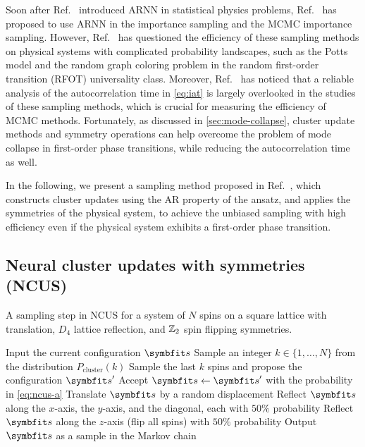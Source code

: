 Soon after Ref.~\cite{wu2019solving} introduced ARNN in statistical physics problems, Ref.~\cite{nicoli2020asymptotically} has proposed to use ARNN in the importance sampling and the MCMC importance sampling. However, Ref.~\cite{ciarella2023machine} has questioned the efficiency of these sampling methods on physical systems with complicated probability landscapes, such as the Potts model and the random graph coloring problem in the random first-order transition (RFOT) universality class. Moreover, Ref.~\cite{bialas2023analysis} has noticed that a reliable analysis of the autocorrelation time in \cref{eq:iat} is largely overlooked in the studies of these sampling methods, which is crucial for measuring the efficiency of MCMC methods. Fortunately, as discussed in \cref{sec:mode-collapse}, cluster update methods and symmetry operations can help overcome the problem of mode collapse in first-order phase transitions, while reducing the autocorrelation time as well.

In the following, we present a sampling method proposed in Ref.~\cite{wu2021unbiased}, which constructs cluster updates using the AR property of the ansatz, and applies the symmetries of the physical system, to achieve the unbiased sampling with high efficiency even if the physical system exhibits a first-order phase transition.

\subsection{Neural cluster updates with symmetries (NCUS)}
\label{sec:ncus}

\begin{algorithm}[H]
\caption[Neural cluster updates with symmetries (NCUS)]{
A sampling step in NCUS for a system of $N$ spins on a square lattice with translation, $D_4$ lattice reflection, and $\mathbb{Z}_2$ spin flipping symmetries.
}
\label{alg:ncus}
\begin{algorithmic}[1]
\STATE Input the current configuration $\vs$
\STATE Sample an integer $k \in \{1, \ldots, N\}$ from the distribution $P_\text{cluster}(k)$
\STATE Sample the last $k$ spins and propose the configuration $\vs'$
\STATE Accept $\vs \gets \vs'$ with the probability in \cref{eq:ncus-a}
\STATE Translate $\vs$ by a random displacement
\STATE Reflect $\vs$ along the $x$-axis, the $y$-axis, and the diagonal, each with $50\%$ probability
\STATE Reflect $\vs$ along the $z$-axis (flip all spins) with $50\%$ probability
\STATE Output $\vs$ as a sample in the Markov chain
\end{algorithmic}
\end{algorithm}

